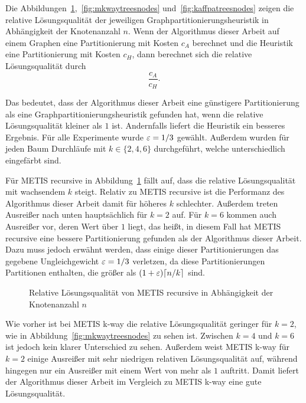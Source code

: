 Die Abbildungen~\ref{fig:mrectreesnodes},~\ref{fig:mkwaytreesnodes} und~\ref{fig:kaffpatreesnodes} zeigen die relative Lösungsqualität der jeweiligen Graphpartitionierungsheuristik in Abhängigkeit der Knotenanzahl $n$.
Wenn der Algorithmus dieser Arbeit auf einem Graphen eine Partitionierung mit Kosten $c_A$ berechnet und die Heuristik eine Partitionierung mit Kosten $c_H$, dann berechnet sich die relative Lösungsqualität durch 
\begin{equation*}
    \frac{c_A}{c_H}. 
\end{equation*}

Das bedeutet, dass der Algorithmus dieser Arbeit eine günstigere Partitionierung als eine Graphpartitionierungsheuristik gefunden hat, wenn die relative Lösungsqualität kleiner als $1$ ist.
Andernfalls liefert die Heuristik ein besseres Ergebnis.
Für alle Experimente wurde $\varepsilon=1/3$ gewählt.
Außerdem wurden für jeden Baum Durchläufe mit $k \in \{2, 4, 6\}$ durchgeführt, welche unterschiedlich eingefärbt sind.

Für METIS recursive in Abbildung~\ref{fig:mrectreesnodes} fällt auf, dass die relative Lösungsqualität mit wachsendem $k$ steigt.
Relativ zu METIS recursive ist die Performanz des Algorithmus dieser Arbeit damit für höheres $k$ schlechter.
Außerdem treten Ausreißer nach unten hauptsächlich für $k=2$ auf.
Für $k=6$ kommen auch Ausreißer vor, deren Wert über $1$ liegt, das heißt, in diesem Fall hat METIS recursive eine bessere Partitionierung gefunden als der Algorithmus dieser Arbeit.
Dazu muss jedoch erwähnt werden, dass einige dieser Partitionierungen das gegebene Ungleichgewicht $\varepsilon=1/3$ verletzen, da diese Partitionierungen Partitionen enthalten, die größer als $(1+\varepsilon) \lceil n/k\rceil$ sind.

\begin{figure}
    \centering
    
    \caption{Relative Lösungsqualität von METIS recursive in Abhängigkeit der Knotenanzahl $n$\label{fig:mrectreesnodes}}
\end{figure}

\pagebreak

Wie vorher ist bei METIS k-way die relative Lösungsqualität geringer für $k=2$, wie in Abbildung~\ref{fig:mkwaytreesnodes} zu sehen ist.
Zwischen $k=4$ und $k=6$ ist jedoch kein klarer Unterschied zu sehen.
Außerdem weist METIS k-way für $k=2$ einige Ausreißer mit sehr niedrigen relativen Lösungsqualität auf, während hingegen nur ein Ausreißer mit einem Wert von mehr als $1$ auftritt.
Damit liefert der Algorithmus dieser Arbeit im Vergleich zu METIS k-way eine gute Lösungsqualität.

